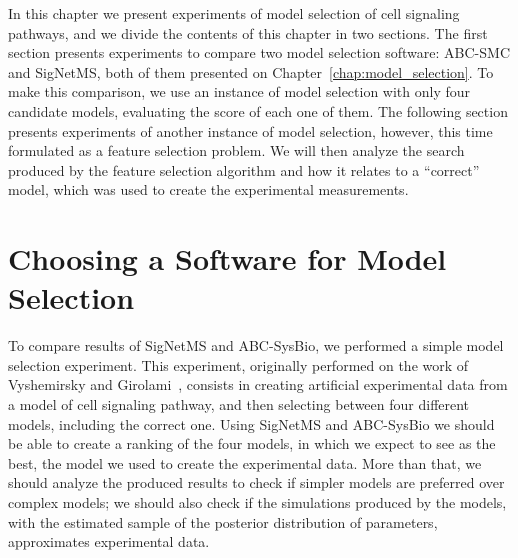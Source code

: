 
In this chapter we present experiments of model selection of cell
signaling pathways, and we divide the contents of this chapter in two 
sections. The first section presents experiments to compare two model 
selection software: ABC-SMC and SigNetMS, both of them presented on 
Chapter~\ref{chap:model_selection}. To make this comparison, we
use an instance of model selection with only four candidate models,
evaluating the score of each one of them. The following section presents
experiments of another instance of model selection, however, this time
formulated as a feature selection problem. We will then analyze the
search produced by the feature selection algorithm and how it relates to
a ``correct'' model, which was used to create the experimental
measurements.

\section{Choosing a Software for Model Selection}
%
%  

To compare results of SigNetMS and ABC-SysBio, we performed a simple 
model selection experiment. This experiment, originally performed on the 
work of Vyshemirsky and Girolami~\cite{Vyshemirsky2007}, consists in 
creating artificial experimental data from a model of cell signaling 
pathway, and then selecting between four different models, including the
correct one. Using SigNetMS and ABC-SysBio we should be able to create a
ranking of the four models, in which we expect to see as the best, the
model we used to create the experimental data. More than that, we should
analyze the produced results to check if simpler models are preferred 
over complex models; we should also check if the simulations produced by
the models, with the estimated sample of the posterior distribution of
parameters, approximates experimental data.

